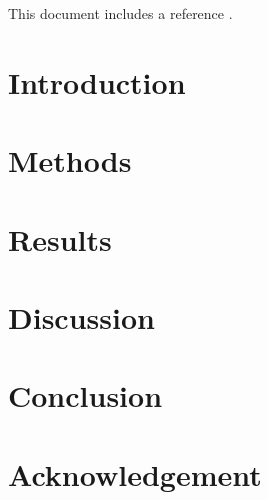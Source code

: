 \documentclass{article}
\begin{document}
\title{\mainTitle}
\author{\Me}
\date{\today}

\maketitle

This document includes a reference \cite{placeholder2025}.


\section{Introduction} \label{sec_intro}

\section{Methods} \label{sec_met}

\section{Results}



\section{Discussion}



\section{Conclusion}



\section*{Acknowledgement}



\end{document}

